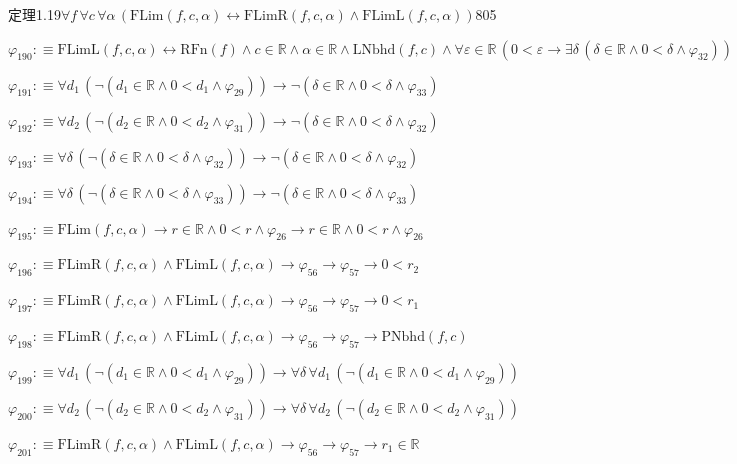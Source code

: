 \begin{fullproof}{定理1.19}{$\forall f\,\forall c\,\forall \alpha\,(\mathrm{FLim}(f,c,\alpha) \leftrightarrow \mathrm{FLimR}(f,c,\alpha) \land \mathrm{FLimL}(f,c,\alpha))$}{805}
\begin{abbrevlist}
\item $\varphi_{190} :\equiv \mathrm{FLimL}(f,c,\alpha) \leftrightarrow \mathrm{RFn}(f) \land c \in \mathbb{R} \land \alpha \in \mathbb{R} \land \mathrm{LNbhd}(f,c) \land \forall \varepsilon \in \mathbb{R}\,(0 < \varepsilon \to \exists \delta\,(\delta \in \mathbb{R} \land 0 < \delta \land \varphi_{32}))$
\item $\varphi_{191} :\equiv \forall d_{1}\,(\neg (d_{1} \in \mathbb{R} \land 0 < d_{1} \land \varphi_{29})) \to \neg (\delta \in \mathbb{R} \land 0 < \delta \land \varphi_{33})$
\item $\varphi_{192} :\equiv \forall d_{2}\,(\neg (d_{2} \in \mathbb{R} \land 0 < d_{2} \land \varphi_{31})) \to \neg (\delta \in \mathbb{R} \land 0 < \delta \land \varphi_{32})$
\item $\varphi_{193} :\equiv \forall \delta\,(\neg (\delta \in \mathbb{R} \land 0 < \delta \land \varphi_{32})) \to \neg (\delta \in \mathbb{R} \land 0 < \delta \land \varphi_{32})$
\item $\varphi_{194} :\equiv \forall \delta\,(\neg (\delta \in \mathbb{R} \land 0 < \delta \land \varphi_{33})) \to \neg (\delta \in \mathbb{R} \land 0 < \delta \land \varphi_{33})$
\item $\varphi_{195} :\equiv \mathrm{FLim}(f,c,\alpha) \to r \in \mathbb{R} \land 0 < r \land \varphi_{26} \to r \in \mathbb{R} \land 0 < r \land \varphi_{26}$
\item $\varphi_{196} :\equiv \mathrm{FLimR}(f,c,\alpha) \land \mathrm{FLimL}(f,c,\alpha) \to \varphi_{56} \to \varphi_{57} \to 0 < r_{2}$
\item $\varphi_{197} :\equiv \mathrm{FLimR}(f,c,\alpha) \land \mathrm{FLimL}(f,c,\alpha) \to \varphi_{56} \to \varphi_{57} \to 0 < r_{1}$
\item $\varphi_{198} :\equiv \mathrm{FLimR}(f,c,\alpha) \land \mathrm{FLimL}(f,c,\alpha) \to \varphi_{56} \to \varphi_{57} \to \mathrm{PNbhd}(f,c)$
\item $\varphi_{199} :\equiv \forall d_{1}\,(\neg (d_{1} \in \mathbb{R} \land 0 < d_{1} \land \varphi_{29})) \to \forall \delta\,\forall d_{1}\,(\neg (d_{1} \in \mathbb{R} \land 0 < d_{1} \land \varphi_{29}))$
\item $\varphi_{200} :\equiv \forall d_{2}\,(\neg (d_{2} \in \mathbb{R} \land 0 < d_{2} \land \varphi_{31})) \to \forall \delta\,\forall d_{2}\,(\neg (d_{2} \in \mathbb{R} \land 0 < d_{2} \land \varphi_{31}))$
\item $\varphi_{201} :\equiv \mathrm{FLimR}(f,c,\alpha) \land \mathrm{FLimL}(f,c,\alpha) \to \varphi_{56} \to \varphi_{57} \to r_{1} \in \mathbb{R}$

\end{abbrevlist}
\end{fullproof}
